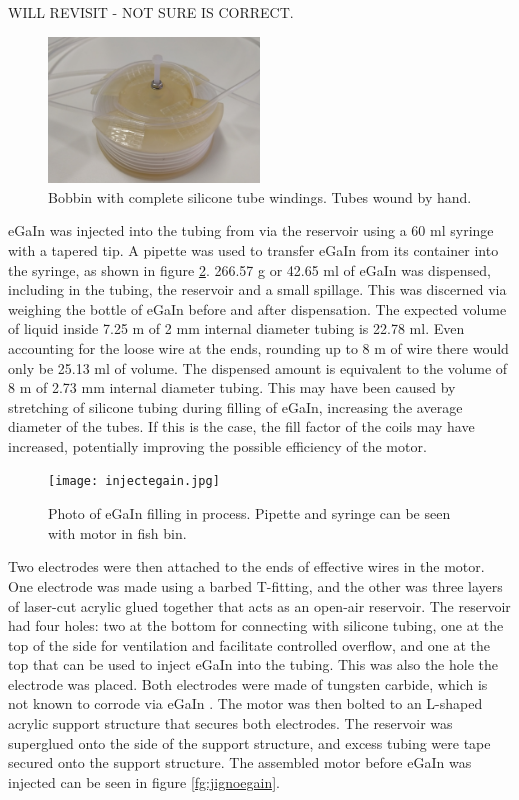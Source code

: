 \documentclass[a4paper,12pt]{article}
\begin{document}
WILL REVISIT - NOT SURE IS CORRECT.

\begin{figure}[h!]
    \centering
    \includegraphics[width=0.5\textwidth]{assembledbobbin.jpg}
    \caption{Bobbin with complete silicone tube windings. Tubes wound by hand.}
    \label{fg:assembledbobbin}
\end{figure}

eGaIn was injected into the tubing from via the reservoir using a 60 ml syringe with a tapered tip. A pipette was used to transfer eGaIn from its container into the syringe, as shown in figure \ref{fg:injectsyringe}. 266.57 g or 42.65 ml of eGaIn was dispensed, including in the tubing, the reservoir and a small spillage. This was discerned via weighing the bottle of eGaIn before and after dispensation. The expected volume of liquid inside 7.25 m of 2 mm internal diameter tubing is 22.78 ml. Even accounting for the loose wire at the ends, rounding up to 8 m of wire there would only be 25.13 ml of volume. The dispensed amount is equivalent to the volume of 8 m of 2.73 mm internal diameter tubing. This may have been caused by stretching of silicone tubing during filling of eGaIn, increasing the average diameter of the tubes. If this is the case, the fill factor of the coils may have increased, potentially improving the possible efficiency of the motor.

\begin{figure}[h!]
    \centering
    \texttt{[image: injectegain.jpg]}
    \caption{Photo of eGaIn filling in process. Pipette and syringe can be seen with motor in fish bin.}
    \label{fg:injectsyringe}
\end{figure}

Two electrodes were then attached to the ends of effective wires in the motor. One electrode was made using a barbed T-fitting, and the other was three layers of laser-cut acrylic glued together that acts as an open-air reservoir. The reservoir had four holes: two at the bottom for connecting with silicone tubing, one at the top of the side for ventilation and facilitate controlled overflow, and one at the top that can be used to inject eGaIn into the tubing. This was also the hole the electrode was placed. Both electrodes were made of tungsten carbide, which is not known to corrode via eGaIn \cite{indiumcorporationPRODUCTDATASHEET2019}. The motor was then bolted to an L-shaped acrylic support structure that secures both electrodes. The reservoir was superglued onto the side of the support structure, and excess tubing were tape secured onto the support structure. The assembled motor before eGaIn was injected can be seen in figure \ref{fg:jignoegain}.
\end{document}
